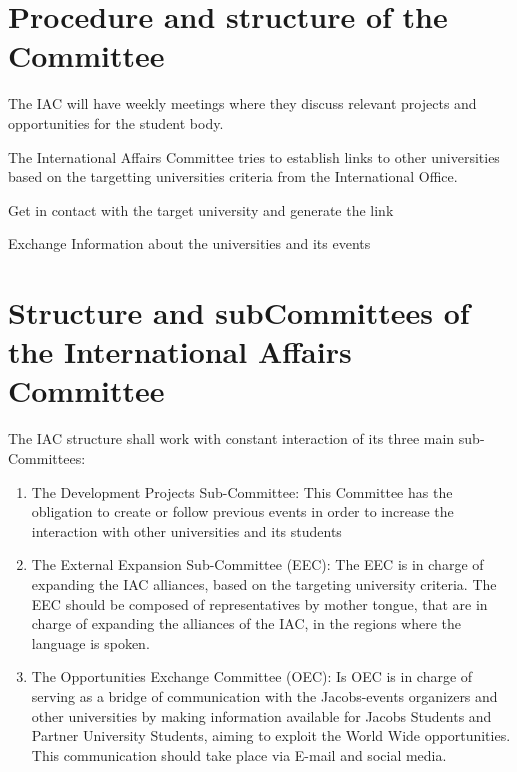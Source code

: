 {\protect\section{Procedure and structure of the Committee}
The IAC will have weekly meetings where they discuss relevant projects and opportunities for the student body.
\protect\begin{parenum}
	\item The International Affairs Committee tries to establish links to other universities based on the targetting universities criteria from the International Office.
	\item Get in contact with the target university and generate the link
	\item  Exchange Information about the universities and its events
 \end{parenum}

\protect\section{Structure and subCommittees of the International Affairs Committee}
	The IAC structure shall work with constant interaction of its three main sub-Committees:
	\protect\begin{enumerate}
		\item The Development Projects Sub-Committee:
		This Committee has the obligation to create or follow previous events in order to increase the
		interaction with other universities and its students
		\item The External Expansion Sub-Committee (EEC):
		The EEC is in charge of expanding the IAC alliances, based on the targeting university criteria.
		The EEC should be composed of representatives by mother tongue, that are in charge of expanding the alliances of the IAC, in the regions where the language is spoken.
		\item The Opportunities Exchange Committee (OEC):
		Is OEC is in charge of serving as a bridge of communication with the Jacobs-events organizers and other universities by making information available for Jacobs Students and Partner University Students, aiming to exploit the World Wide opportunities.
		This communication should take place via E-mail and social media.
	\end{enumerate}

}
